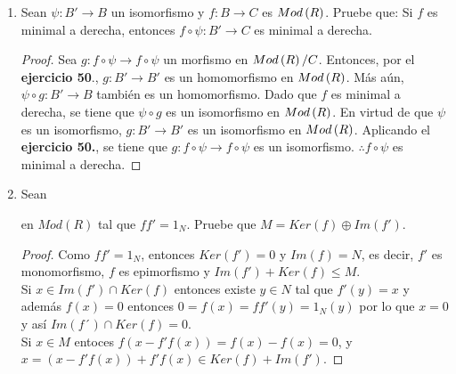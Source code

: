 \documentclass{article}
\begin{document}
\begin{enumerate}[label=\textbf{Ej \arabic*.}]
\begin{proof}
\begin{equation*}
\begin{split}
					hp'&=g\\
					gq'&=h.
				\end{split}
			\end{equation*}
			Así $p'p\in\ringmodhom{R}{A}{B}$, $qq'\in\ringmodhom{R}{B}{A}$ y
			\begin{equation*}
				\begin{split}
					h\lrprth{p'p}&=f\\
					f\lrprth{qq'}&=h,\\			
					\therefore\ f&\sim h.
				\end{split}
			\end{equation*}
		\end{proof}
		\item Sean $\psi : B' \longrightarrow B$ un isomorfismo y $f:B \longrightarrow C$ es $Mod\left(R\right)$. Pruebe que: Si $f$ es minimal a derecha, entonces $f\circ\psi :B' \longrightarrow C$ es minimal a derecha.
		\begin{proof}
			Sea $g:f\circ\psi \longrightarrow f\circ\psi$ un morfismo en $Mod\left(R\right)/C$. Entonces, por el \textbf{ejercicio 50}., $g:B' \longrightarrow B'$ es un homomorfismo en $Mod\left(R\right)$. Más aún, $\psi \circ g:B' \longrightarrow B$ también es un homomorfismo. Dado que $f$ es minimal a derecha, se tiene que $\psi \circ g$ es un isomorfismo en $Mod\left(R\right)$. En virtud de que $\psi$ es un isomorfismo, $g:B' \longrightarrow B'$ es un isomorfismo en $Mod\left(R\right)$. Aplicando el \textbf{ejercicio 50.}, se tiene que $g:f\circ\psi \longrightarrow f\circ\psi$ es un isomorfismo. $\therefore f\circ\psi$ es minimal a derecha.
		\end{proof}
		\item Sean 
		en $Mod(R)$ tal que $ff'=1_N.$ Pruebe que $M=Ker(f)\oplus Im(f')$.
		\begin{proof}
			Como $ff'=1_N$, entonces $Ker(f')=0$ y $Im(f)=N$, es decir, $f'$ es monomorfismo, $f$ es epimorfismo y  $Im(f')+Ker(f)\leq M$.\\
			Si $x\in Im(f')\cap Ker(f)$ entonces existe $y\in N$ tal que $f'(y)=x$ y además $f(x)=0$ entonces $0=f(x)=ff'(y)=1_N(y)$
			por lo que $x=0$ y así $Im(f´)\cap Ker(f)=0$.\\
			
			Si $x\in M$ entoces $f(x-f'f(x))=f(x)-f(x)=0$, \quad y \\
			$x=(x-f'f(x))+f'f(x)\in Ker (f)+Im(f').$
		\end{proof}
		
	\end{enumerate}
\end{document}
